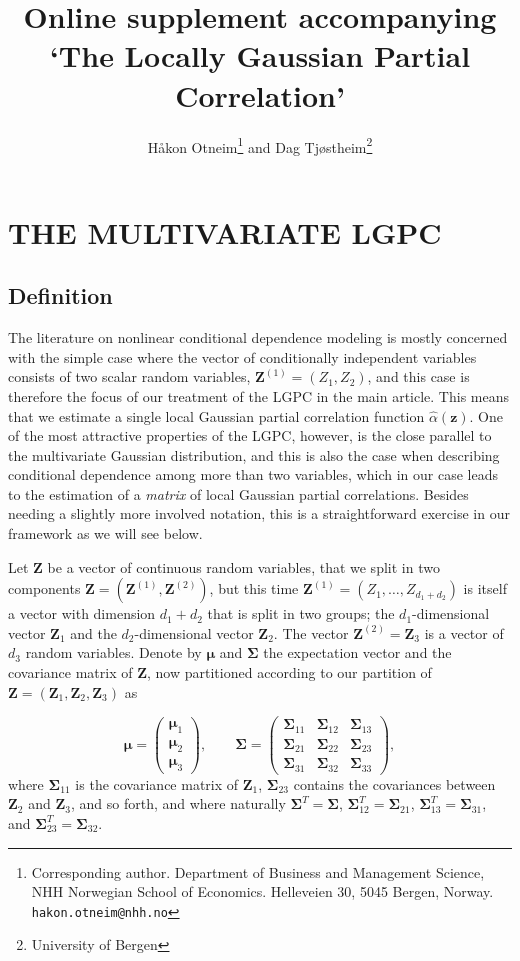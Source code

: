 \documentclass[
  12pt,
  letterpaper]{article}
\title{Online supplement accompanying `The Locally Gaussian Partial Correlation'}
\author{Håkon Otneim\footnote{Corresponding author. Department of Business and Management Science, NHH Norwegian School of Economics. Helleveien 30, 5045 Bergen, Norway. \texttt{hakon.otneim@nhh.no}} and Dag Tjøstheim\footnote{University of Bergen}}
\date{}
\numberwithin{equation}{section}
\newcommand{\Z}{\bm{Z}}
\newcommand{\z}{\bm{z}}
\newcommand{\Zone}{\bm{Z}^{(1)}}
\newcommand{\Ztwo}{\bm{Z}^{(2)}}
\newcommand{\fmu}{\bm{\mu}}
\newcommand{\fSigma}{\bm{\Sigma}}
\begin{document}
\maketitle

\hypertarget{the-multivariate-lgpc}{%
\section{THE MULTIVARIATE LGPC}\label{the-multivariate-lgpc}}

\hypertarget{definition}{%
\subsection{Definition}\label{definition}}

The literature on nonlinear conditional dependence modeling is mostly concerned with the simple case where the vector of conditionally independent variables consists of two scalar random variables, \(\Zone = (Z_1, Z_2)\), and this case is therefore the focus of our treatment of the LGPC in the main article. This means that we estimate a single local Gaussian partial correlation function \(\widehat \alpha(\z)\). One of the most attractive properties of the LGPC, however, is the close parallel to the multivariate Gaussian distribution, and this is also the case when describing conditional dependence among more than two variables, which in our case leads to the estimation of a \emph{matrix} of local Gaussian partial correlations. Besides needing a slightly more involved notation, this is a straightforward exercise in our framework as we will see below.

Let \(\Z\) be a vector of continuous random variables, that we split in two components \(\Z = (\Zone, \Ztwo)\), but this time \(\Zone = (Z_1, \ldots, Z_{d_1 + d_2})\) is itself a vector with dimension \(d_1 + d_2\) that is split in two groups; the \(d_1\)-dimensional vector \(\Z_1\) and the \(d_2\)-dimensional vector \(\Z_2\). The vector \(\Ztwo = \Z_3\) is a vector of \(d_3\) random variables. Denote by \(\fmu\) and \(\fSigma\) the expectation vector and the covariance matrix of \(\Z\), now partitioned according to our partition of \(\Z = (\Z_1, \Z_2, \Z_3)\) as

\[\fmu = \begin{pmatrix} \fmu_1 \\ \fmu_2 \\ \fmu_3 \end{pmatrix}, \qquad \fSigma = \begin{pmatrix} \fSigma_{11} & \fSigma_{12} & \fSigma_{13} \\ \fSigma_{21} & \fSigma_{22} & \fSigma_{23} \\ \fSigma_{31} & \fSigma_{32} & \fSigma_{33} \end{pmatrix},\]
where \(\fSigma_{11}\) is the covariance matrix of \(\Z_1\), \(\fSigma_{23}\) contains the covariances between \(\Z_2\) and \(\Z_3\), and so forth, and where naturally \(\fSigma^T = \fSigma\), \(\fSigma_{12}^T = \fSigma_{21}\), \(\fSigma_{13}^T = \fSigma_{31}\), and \(\fSigma_{23}^T = \fSigma_{32}\).
\end{document}
